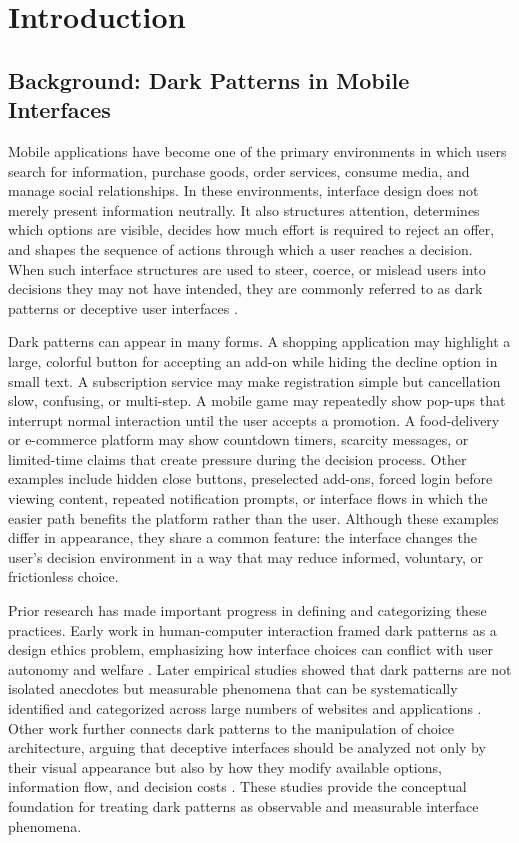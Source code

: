 \chapter{Introduction}

\section{Background: Dark Patterns in Mobile Interfaces}

Mobile applications have become one of the primary environments in which users search for information, purchase goods, order services, consume media, and manage social relationships. In these environments, interface design does not merely present information neutrally. It also structures attention, determines which options are visible, decides how much effort is required to reject an offer, and shapes the sequence of actions through which a user reaches a decision. When such interface structures are used to steer, coerce, or mislead users into decisions they may not have intended, they are commonly referred to as dark patterns or deceptive user interfaces \cite{gray2018darkpatterns,mathur2019darkpatterns}.

Dark patterns can appear in many forms. A shopping application may highlight a large, colorful button for accepting an add-on while hiding the decline option in small text. A subscription service may make registration simple but cancellation slow, confusing, or multi-step. A mobile game may repeatedly show pop-ups that interrupt normal interaction until the user accepts a promotion. A food-delivery or e-commerce platform may show countdown timers, scarcity messages, or limited-time claims that create pressure during the decision process. Other examples include hidden close buttons, preselected add-ons, forced login before viewing content, repeated notification prompts, or interface flows in which the easier path benefits the platform rather than the user. Although these examples differ in appearance, they share a common feature: the interface changes the user’s decision environment in a way that may reduce informed, voluntary, or frictionless choice.

Prior research has made important progress in defining and categorizing these practices. Early work in human-computer interaction framed dark patterns as a design ethics problem, emphasizing how interface choices can conflict with user autonomy and welfare \cite{gray2018darkpatterns}. Later empirical studies showed that dark patterns are not isolated anecdotes but measurable phenomena that can be systematically identified and categorized across large numbers of websites and applications \cite{mathur2019darkpatterns}. Other work further connects dark patterns to the manipulation of choice architecture, arguing that deceptive interfaces should be analyzed not only by their visual appearance but also by how they modify available options, information flow, and decision costs \cite{mathur2021whatmakesdark}. These studies provide the conceptual foundation for treating dark patterns as observable and measurable interface phenomena.

